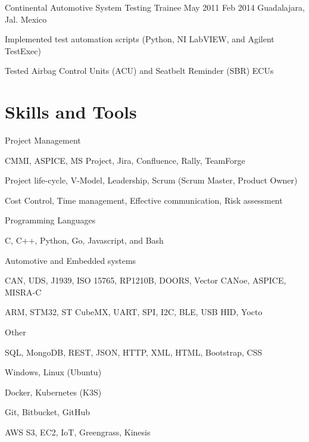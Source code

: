 \documentclass{resume} %
\begin{document}
\job
    {Continental Automotive}
    {System Testing Trainee}
    {May 2011}
    {Feb 2014}
    {Guadalajara, Jal. Mexico}
    {
    \begin{itemize-bullets}
    \item{Implemented test automation scripts (Python, NI LabVIEW, and Agilent TestExec)}
    \item{Tested Airbag Control Units (ACU) and Seatbelt Reminder (SBR) ECUs}
    \end{itemize-bullets}
    }



\section{Skills and Tools}


\skillgroup
    {Project Management}
    {
    \begin{itemize-bullets}
        \item{CMMI, ASPICE, MS Project, Jira, Confluence, Rally, TeamForge}
        \item{Project life-cycle, V-Model, Leadership, Scrum (Scrum Master, Product Owner)}
        \item{Cost Control, Time management, Effective communication, Risk assessment}
        \end{itemize-bullets}
    }


\skillgroup
    {Programming Languages}
    {
    \begin{itemize-bullets}
        \item{C, C++, Python, Go, Javascript, and Bash}
        \end{itemize-bullets}
    }


\skillgroup
    {Automotive and Embedded systems}
    {
    \begin{itemize-bullets}
        \item{CAN, UDS, J1939, ISO 15765, RP1210B, DOORS, Vector CANoe, ASPICE, MISRA-C}
        \item{ARM, STM32, ST CubeMX, UART, SPI, I2C, BLE, USB HID, Yocto}
        \end{itemize-bullets}
    }


\skillgroup
    {Other}
    {
    \begin{itemize-bullets}
        \item{SQL, MongoDB, REST, JSON, HTTP, XML, HTML, Bootstrap, CSS}
        \item{Windows, Linux (Ubuntu)}
        \item{Docker, Kubernetes (K3S)}
        \item{Git, Bitbucket, GitHub}
        \item{AWS S3, EC2, IoT, Greengrass, Kinesis}
        \end{itemize-bullets}
    }
\end{document}
